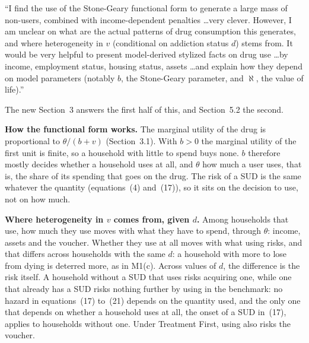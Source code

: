 \documentclass[11pt]{article}
\begin{document}
\begin{referee}
``I find the use of the Stone-Geary functional form to generate a large mass of
non-users, combined with income-dependent penalties \dots very clever. However, I
am unclear on what are the actual patterns of drug consumption this generates, and
where heterogeneity in $v$ (conditional on addiction status $d$) stems from. It
would be very helpful to present model-derived stylized facts on drug use \dots by
income, employment status, housing status, assets \dots and explain how they depend
on model parameters (notably $b$, the Stone-Geary parameter, and $\aleph$, the value
of life).''
\end{referee}
\begin{response}
The new Section~3 answers the first half of this, and Section~5.2 the second.

\textbf{How the functional form works.} The marginal utility of the drug is
proportional to $\theta/(b+v)$ (Section~3.1). With $b>0$ the marginal utility of the
first unit is finite, so a household with little to spend buys none. $b$ therefore
mostly decides whether a household uses at all, and $\theta$ how much a user uses,
that is, the share of its spending that goes on the drug. The risk of a SUD is the
same whatever the quantity (equations~(4) and~(17)), so it sits on the decision to use,
not on how much.

\textbf{Where heterogeneity in $v$ comes from, given $d$.} Among households that use,
how much they use moves with what they have to spend, through $\theta$: income, assets
and the voucher. Whether they use at all moves with what using risks, and that differs
across households with the same $d$: a household with more to lose from dying is
deterred more, as in M1(c). Across values of $d$, the difference is the risk itself. A
household without a SUD that uses risks acquiring one, while one that already has a
SUD risks nothing further by using in the benchmark: no hazard in equations~(17)
to~(21) depends on the quantity used, and the only one that depends on whether a
household uses at all, the onset of a SUD in~(17), applies to households without one.
Under Treatment First, using also risks the voucher.


\end{response}
\end{document}
